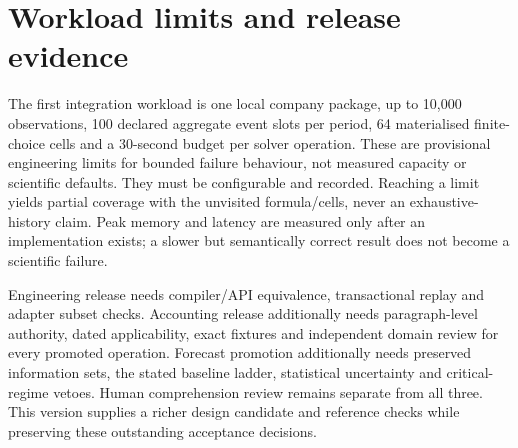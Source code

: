 \section{Workload limits and release evidence}

The first integration workload is one local company package, up to 10,000
observations, 100 declared aggregate event slots per period, 64 materialised
finite-choice cells and a 30-second budget per solver operation. These are
provisional engineering limits for bounded failure behaviour, not measured
capacity or scientific defaults. They must be configurable and recorded.
Reaching a limit yields partial coverage with the unvisited formula/cells,
never an exhaustive-history claim. Peak memory and latency are measured only
after an implementation exists; a slower but semantically correct result
does not become a scientific failure.

Engineering release needs compiler/API equivalence, transactional replay and
adapter subset checks. Accounting release additionally needs paragraph-level
authority, dated applicability, exact fixtures and independent domain review
for every promoted operation. Forecast promotion additionally needs preserved
information sets, the stated baseline ladder, statistical uncertainty and
critical-regime vetoes. Human comprehension review remains separate from all
three. This version supplies a richer design candidate and reference
checks while preserving these outstanding acceptance decisions.
